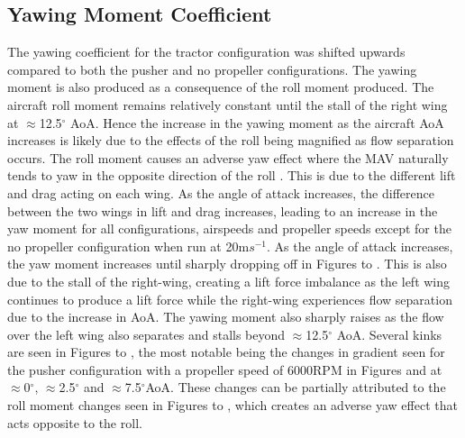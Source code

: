 \subsection{Yawing Moment Coefficient}
 The yawing coefficient for the tractor configuration was shifted upwards compared to both the pusher and no propeller configurations. The yawing moment is also produced as a consequence of the roll moment produced. The aircraft roll moment remains relatively constant until the stall of the right wing at $\approx$12.5$^{\circ}$ \acrshort{AoA}. Hence the increase in the yawing moment as the aircraft \acrshort{AoA} increases is likely due to the effects of the roll being magnified as flow separation occurs. The roll moment causes an adverse yaw effect where the MAV naturally tends to yaw in the opposite direction of the roll . This is due to the different lift and drag acting on each wing. As the angle of attack increases, the difference between the two wings in lift and drag increases, leading to an increase in the yaw moment for all configurations, airspeeds and propeller speeds except for the no propeller configuration when run at 20m$s^{-1}$. As the angle of attack increases, the yaw moment increases until sharply dropping off in Figures  to . This is also due to the stall of the right-wing, creating a lift force imbalance as the left wing continues to produce a lift force while the right-wing experiences flow separation due to the increase in \acrshort{AoA}. The yawing moment also sharply raises as the flow over the left wing also separates and stalls beyond $\approx$12.5$^{\circ}$ \acrshort{AoA}. Several kinks are seen in Figures  to , the most notable being the changes in gradient seen for the pusher configuration with a propeller speed of 6000RPM in Figures  and  at $\approx$0$^{\circ}$, $\approx$2.5$^{\circ}$ and $\approx$7.5$^{\circ}$\acrshort{AoA}. These changes can be partially attributed to the roll moment changes seen in Figures 
  to , which creates an adverse yaw effect that acts opposite to the roll. 

